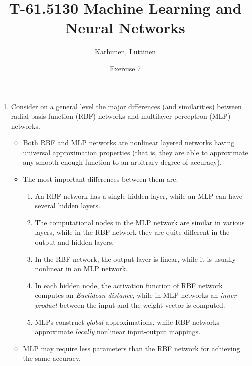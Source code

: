 
\title{T-61.5130 Machine Learning and Neural Networks}
\author{Karhunen, Luttinen}
\date{Exercise 7}

\newcommand{\vect}[1]{{\bf{#1}}}
\newcommand{\svect}[1]{\boldsymbol{#1}}
\newcommand{\matr}[1]{\boldsymbol{#1}}

\usepackage{graphicx}



\maketitle

\begin{enumerate}

\item Consider on a general level the major differences (and similarities)
  between radial-basis function (RBF) networks and multilayer perceptron
  (MLP) networks.

  \begin{solution}

    \begin{itemize}
    \item Both RBF and MLP networks are nonlinear layered networks having
      universal approximation properties (that is, they are able to
      approximate any smooth enough function to an arbitrary degree of accuracy).
    \item The most important differences between them are:
      \begin{enumerate}
      \item An RBF network has a single hidden layer, while an MLP can have
        several hidden layers.
      \item The computational nodes in the MLP network are similar in various layers,
        while in the RBF network they are quite different in the output
        and hidden layers.
      \item In the RBF network, the output layer is linear, while it is usually
        nonlinear in an MLP network.
      \item In each hidden node, the activation function of RBF network computes
        an {\em Euclidean distance}, while in MLP networks an {\em inner product}
        between the input and the weight vector is computed.
      \item MLPs construct {\em global} approximations, while RBF networks
        approximate {\em locally} nonlinear input-output mappings.
      \end{enumerate}
    \item MLP may require less parameters than the RBF network for achieving
      the same accuracy.
    \end{itemize}


\end{solution}
\end{enumerate}

